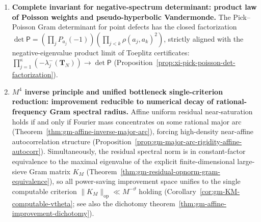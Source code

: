 \begin{enumerate}
  \item \textbf{Complete invariant for negative-spectrum determinant: product law of Poisson weights and pseudo-hyperbolic Vandermonde.}
  The Pick--Poisson Gram determinant for point defects has the closed factorization
  \(
  \det\mathsf P=(\prod_j P_{a_j}(-1))(\prod_{j<k}\rho(a_j,a_k)^2)
  \), strictly aligned with the negative-eigenvalue product limit of Toeplitz certificates:
  \(\prod_{j=1}^{\kappa}(-\lambda_j^-(\mathbf{T}_N))\to\det\mathsf P\)
  (Proposition~\ref{prop:xi-pick-poisson-det-factorization}).

  \item \textbf{\texorpdfstring{$M^4$}{M^4} inverse principle and unified bottleneck single-criterion reduction: improvement reducible to numerical decay of rational-frequency Gram spectral radius.}
  Affine uniform residual near-saturation holds if and only if Fourier mass concentrates on some rational major arc (Theorem~\ref{thm:gm-affine-inverse-major-arc}), forcing high-density near-affine autocorrelation structure (Proposition~\ref{prop:gm-major-arc-rigidity-affine-autocorr}).
  Simultaneously, the residual spectral norm is in constant-factor equivalence to the maximal eigenvalue of the explicit finite-dimensional large-sieve Gram matrix \(K_M\) (Theorem~\ref{thm:gm-residual-opnorm-gram-equivalence}), so all power-saving improvement space unifies to the single computable criterion
  \(
  \|K_M\|_{\mathrm{op}}\ll M^{-\vartheta}
  \)
  holding (Corollary~\ref{cor:gm-KM-computable-vtheta}; see also the dichotomy theorem~\ref{thm:gm-affine-improvement-dichotomy}).
\end{enumerate}

